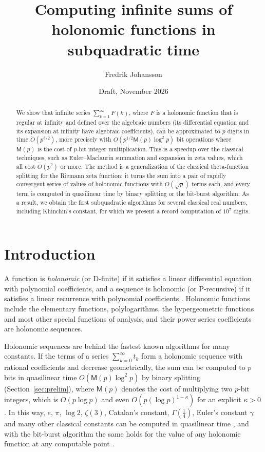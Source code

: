 \documentclass[11pt]{amsart}
\title[Sums of holonomic functions in subquadratic time]{Computing infinite sums of holonomic functions in subquadratic time}
\author{Fredrik Johansson}
\date{Draft, November 2026}
\theoremstyle{definition}
\theoremstyle{remark}
\newcommand{\Mul}{\mathsf{M}}
\begin{document}
\begin{abstract}
We show that infinite series $\sum_{k=1}^{\infty} F(k)$, where $F$ is a holonomic function that is regular at
infinity and defined over the algebraic numbers (its differential equation and its expansion at infinity have
algebraic coefficients), can be approximated to $p$ digits in time
$\widetilde O(p^{3/2})$, more precisely with $O(p^{1/2}\Mul(p)\log^2 p)$ bit operations where $\Mul(p)$ is the
cost of $p$-bit integer multiplication. This is a speedup over the classical techniques, such as
Euler--Maclaurin summation and expansion in zeta values, which all cost $\widetilde O(p^2)$ or more. The method
is a generalization of the classical theta-function splitting for the Riemann zeta function: it turns the
sum into a pair of rapidly convergent series of values of holonomic functions with $O(\sqrt p)$ terms each, and
every term is computed in quasilinear time by binary splitting or the bit-burst algorithm. As a result, we obtain the first
subquadratic algorithms for several classical real numbers, including Khinchin's constant, for which we
present a record computation of $10^7$ digits.
\end{abstract}

\maketitle



\section{Introduction}\label{sec:intro}

A function is \emph{holonomic} (or D-finite) if it satisfies a linear differential equation with polynomial
coefficients, and a sequence is holonomic (or P-recursive) if it satisfies a linear recurrence with polynomial
coefficients \cite{Sta80}. Holonomic functions include the elementary functions, polylogarithms, the
hypergeometric functions and most other special functions of analysis, and their power series coefficients are
holonomic sequences.

Holonomic sequences are behind the fastest known algorithms for many constants. If the terms of a series
$\sum_{k=0}^{\infty} t_k$ form a holonomic sequence with rational coefficients and decrease geometrically, the sum can be
computed to $p$ bits in quasilinear time $O(\Mul(p)\log^2p)$ by binary splitting
(Section~\ref{sec:prelim}), where $\Mul(p)$ denotes the cost of multiplying two $p$-bit integers, which is
$O(p\log p)$ \cite{HvdH21} and even $O(p(\log p)^{1-\kappa})$ for an explicit $\kappa > 0$ \cite{OAI26}. In this way, $e$, $\pi$, $\log 2$, $\zeta(3)$, Catalan's constant, $\Gamma(\frac14)$,
Euler's constant $\gamma$ and many other classical constants can be computed in quasilinear time
\cite{BB87,HP98,BM80,BZ10}, and with the bit-burst algorithm the same holds for the value of any holonomic
function at any computable point \cite{CC90,vdH99}.
\end{document}
